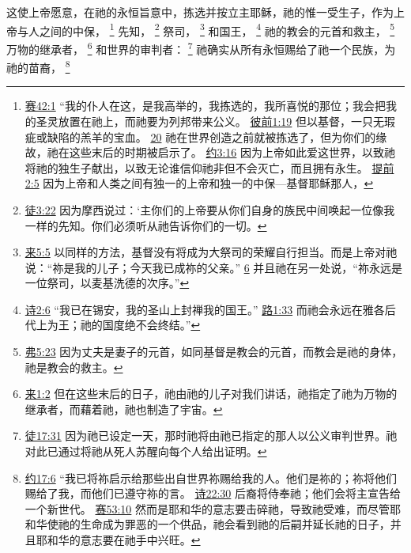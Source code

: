 \documentclass[12pt, a4paper, oneside]{ctexart}
\newcounter{parnum}[section]
\newcommand{\N}{%
   \noindent\refstepcounter{parnum}%
    \makebox[\parindent][l]{\textbf{\arabic{parnum}.}}}
\begin{document}
\N 这使上帝愿意，在祂的永恒旨意中，拣选并按立主耶稣，祂的惟一受生子，作为上帝与人之间的中保，
	\footnote {
		\href{https://biblehub.com/isaiah/42-1.htm}{赛42:1} “我的仆人在这，是我高举的，我拣选的，我所喜悦的那位；我会把我的圣灵放置在祂上，而祂要为列邦带来公义。
		\href{https://biblehub.com/1_peter/1-19.htm}{彼前1:19} 但以基督，一只无瑕疵或缺陷的羔羊的宝血。
		\href{https://biblehub.com/1_peter/1-20.htm}{20} 祂在世界创造之前就被拣选了，但为你们的缘故，祂在这些末后的时期被启示了。
		\href{https://biblehub.com/john/3-16.htm}{约3:16} 因为上帝如此爱这世界，以致祂将祂的独生子献出，以致无论谁信仰祂非但不会灭亡，而且拥有永生。
		\href{https://biblehub.com/1_timothy/2-5.htm}{提前2:5} 因为上帝和人类之间有独一的上帝和独一的中保---基督耶稣那人，
	}
	先知，
	\footnote {
		\href{https://biblehub.com/acts/3-22.htm}{徒3:22} 因为摩西说过：‘主你们的上帝要从你们自身的族民中间唤起一位像我一样的先知。你们必须听从祂告诉你们的一切。
	}
	祭司，
	\footnote {
		\href{https://biblehub.com/hebrews/5-5.htm}{来5:5} 以同样的方法，基督没有将成为大祭司的荣耀自行担当。而是上帝对祂说：“祢是我的儿子；今天我已成祢的父亲。”
		\href{https://biblehub.com/hebrews/5-6.htm}{6} 并且祂在另一处说，“祢永远是一位祭司，以麦基洗德的次序。”
	}
	和国王，
	\footnote {
		\href{https://biblehub.com/psalms/2-6.htm}{诗2:6} “我已在锡安，我的圣山上封禅我的国王。”
		\href{https://biblehub.com/luke/1-33.htm}{路1:33} 而祂会永远在雅各后代上为王；祂的国度绝不会终结。”
	}
	祂的教会的元首和救主，
	\footnote {
		\href{https://biblehub.com/ephesians/5-23.htm}{弗5:23} 因为丈夫是妻子的元首，如同基督是教会的元首，而教会是祂的身体，祂是教会的救主。
	}
	万物的继承者，
	\footnote {
		\href{https://biblehub.com/hebrews/1-2.htm}{来1:2} 但在这些末后的日子，祂由祂的儿子对我们讲话，祂指定了祂为万物的继承者，而藉着祂，祂也制造了宇宙。
	}
	和世界的审判者：
	\footnote {
		\href{https://biblehub.com/acts/17-31.htm}{徒17:31} 因为祂已设定一天，那时祂将由祂已指定的那人以公义审判世界。祂对此已通过将祂从死人苏醒向每个人给出证明。
	}
	祂确实从所有永恒赐给了祂一个民族，为祂的苗裔，
	\footnote {
		\href{https://biblehub.com/john/17-6.htm}{约17:6} “我已将祢启示给那些出自世界祢赐给我的人。他们是祢的；祢将他们赐给了我，而他们已遵守祢的言。
		\href{https://biblehub.com/psalms/22-30.htm}{诗22:30} 后裔将侍奉祂；他们会将主宣告给一个新世代。
		\href{https://biblehub.com/isaiah/53-10.htm}{赛53:10} 然而是耶和华的意志要击碎祂，导致祂受难，而尽管耶和华使祂的生命成为罪恶的一个供品，祂会看到祂的后嗣并延长祂的日子，并且耶和华的意志要在祂手中兴旺。
	}
\end{document}
